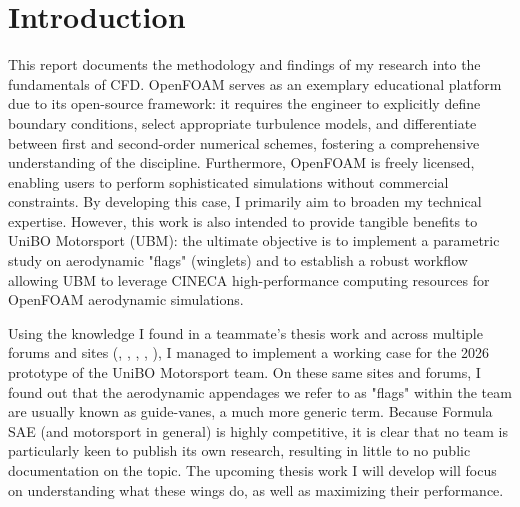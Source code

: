 \documentclass[a4paper]{article}
\begin{document}
	\section{Introduction}
	This report documents the methodology and findings of my research into the fundamentals of CFD.
	OpenFOAM serves as an exemplary educational platform due to its open-source framework: it requires the engineer to explicitly define boundary conditions, select appropriate turbulence models, and differentiate between first and second-order numerical schemes, fostering a comprehensive understanding of the discipline.
	Furthermore, OpenFOAM is freely licensed, enabling users to perform sophisticated simulations without commercial constraints.
	By developing this case, I primarily aim to broaden my technical expertise.
	However, this work is also intended to provide tangible benefits to UniBO Motorsport (UBM): the ultimate objective is to implement a parametric study on aerodynamic "flags" (winglets) and to establish a robust workflow allowing UBM to leverage CINECA high-performance computing resources for OpenFOAM aerodynamic simulations. 
	
	Using the knowledge I found in a teammate's thesis work \cite{Bellucci} and across multiple forums and sites (\cite{OpenFoamDoc}, \cite{SimScaleFS}, \cite{leap}, \cite{SimScaleFS}, \cite{CFDOnline}), I managed to implement a working case for the 2026 prototype of the UniBO Motorsport team. On these same sites and forums, I found out that the aerodynamic appendages we refer to as "flags" within the team are usually known as guide-vanes, a much more generic term. Because Formula SAE (and motorsport in general) is highly competitive, it is clear that no team is particularly keen to publish its own research, resulting in little to no public documentation on the topic. The upcoming thesis work I will develop will focus on understanding what these wings do, as well as maximizing their performance.
	
	
\end{document}
